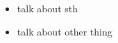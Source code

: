 \documentclass{beamer}
\begin{document}
\begin{frame}
\begin{itemize}
    \item talk about sth
    \pause
    \item talk about other thing
\end{itemize}


\end{frame}  
\end{document}
